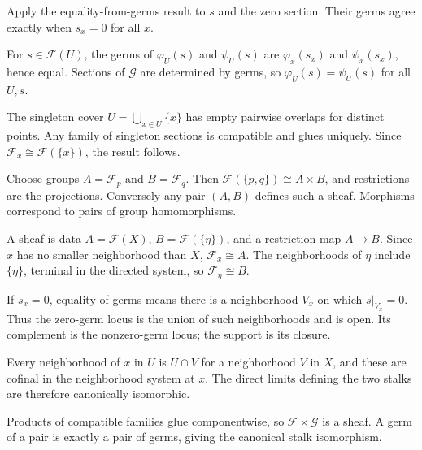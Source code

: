 \begin{solution}
Apply the equality-from-germs result to $s$ and the zero section. Their germs agree exactly when $s_x=0$ for all $x$.
\end{solution}

\begin{solution}
For $s\in\mathcal F(U)$, the germs of $\varphi_U(s)$ and $\psi_U(s)$ are $\varphi_x(s_x)$ and $\psi_x(s_x)$, hence equal. Sections of $\mathcal G$ are determined by germs, so $\varphi_U(s)=\psi_U(s)$ for all $U,s$.
\end{solution}

\begin{solution}
The singleton cover $U=\bigcup_{x\in U}\{x\}$ has empty pairwise overlaps for distinct points. Any family of singleton sections is compatible and glues uniquely. Since $\mathcal F_x\cong\mathcal F(\{x\})$, the result follows.
\end{solution}

\begin{solution}
Choose groups $A=\mathcal F_p$ and $B=\mathcal F_q$. Then $\mathcal F(\{p,q\})\cong A\times B$, and restrictions are the projections. Conversely any pair $(A,B)$ defines such a sheaf. Morphisms correspond to pairs of group homomorphisms.
\end{solution}

\begin{solution}
A sheaf is data $A=\mathcal F(X)$, $B=\mathcal F(\{\eta\})$, and a restriction map $A\to B$. Since $x$ has no smaller neighborhood than $X$, $\mathcal F_x\cong A$. The neighborhoods of $\eta$ include $\{\eta\}$, terminal in the directed system, so $\mathcal F_\eta\cong B$.
\end{solution}

\begin{solution}
If $s_x=0$, equality of germs means there is a neighborhood $V_x$ on which $s|_{V_x}=0$. Thus the zero-germ locus is the union of such neighborhoods and is open. Its complement is the nonzero-germ locus; the support is its closure.
\end{solution}

\begin{solution}
Every neighborhood of $x$ in $U$ is $U\cap V$ for a neighborhood $V$ in $X$, and these are cofinal in the neighborhood system at $x$. The direct limits defining the two stalks are therefore canonically isomorphic.
\end{solution}

\begin{solution}
Products of compatible families glue componentwise, so $\mathcal F\times\mathcal G$ is a sheaf. A germ of a pair is exactly a pair of germs, giving the canonical stalk isomorphism.
\end{solution}

